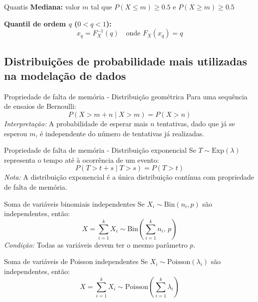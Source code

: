 \documentclass[a4paper,12pt]{article}
\begin{document}
\begin{formulabox}{Quantis}
\textbf{Mediana:} valor $m$ tal que $P(X \leq m) \geq 0.5$ e $P(X \geq m) \geq 0.5$

\textbf{Quantil de ordem $q$ ($0 < q < 1$):}
\begin{equation}\label{formula11}\tag{Fórmula 11}
    x_q = F_X^{-1}(q) \quad \text{onde } F_X(x_q) = q
\end{equation}
\end{formulabox}

\subsection{Distribuições de probabilidade mais utilizadas na modelação de dados}

\begin{formulabox}{Propriedade de falta de memória - Distribuição geométrica}
Para uma sequência de ensaios de Bernoulli:
\begin{equation}\label{formula12}\tag{Fórmula 12}
    P(X > m + n \mid X > m) = P(X > n)
\end{equation}
\textit{Interpretação:} A probabilidade de esperar mais $n$ tentativas, dado que já se esperou $m$, é independente do número de tentativas já realizadas.
\end{formulabox}

\begin{formulabox}{Propriedade de falta de memória - Distribuição exponencial}
Se $T \sim \mathrm{Exp}(\lambda)$ representa o tempo até à ocorrência de um evento:
\begin{equation}\label{formula13}\tag{Fórmula 13}
    P(T > t + s \mid T > s) = P(T > t)
\end{equation}
\textit{Nota:} A distribuição exponencial é a única distribuição contínua com propriedade de falta de memória.
\end{formulabox}

\begin{formulabox}{Soma de variáveis binomiais independentes}
Se $X_i \sim \mathrm{Bin}(n_i, p)$ são independentes, então:
\begin{equation}\label{formula14}\tag{Fórmula 14}
    X = \sum_{i=1}^k X_i \sim \mathrm{Bin}\left(\sum_{i=1}^k n_i,\, p\right)
\end{equation}
\textit{Condição:} Todas as variáveis devem ter o mesmo parâmetro $p$.
\end{formulabox}

\begin{formulabox}{Soma de variáveis de Poisson independentes}
Se $X_i \sim \mathrm{Poisson}(\lambda_i)$ são independentes, então:
\begin{equation}\label{formula15}\tag{Fórmula 15}
    X = \sum_{i=1}^k X_i \sim \mathrm{Poisson}\left(\sum_{i=1}^k \lambda_i\right)
\end{equation}
\end{formulabox}
\end{document}
